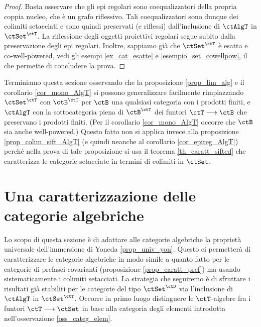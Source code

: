 \begin{proof} Basta osservare che gli epi regolari sono coequalizzatori della propria coppia nucleo, che è un grafo riflessivo.
 Tali coequalizzatori sono dunque dei colimiti setacciati e sono quindi preservati (e riflessi) dall'inclusione di \(\ctAlgT\) in \(\ctSet^{\ctT}\).
 La riflessione degli oggetti proiettivi regolari segue subito dalla preservazione degli epi regolari.
 Inoltre, sappiamo già che \(\ctSet^{\ctT}\) è esatta e co-well-powered, vedi gli esempi \ref{ex_cat_esatte} e \ref{esempio_set_cowellpow},
 il che permette di concludere la prova.
\end{proof}

\begin{remark}\label{oss_gener_limcolim}
 Terminiamo questa sezione osservando che la proposizione \ref{prop_lim_alg} e il corollario \ref{cor_mono_AlgT} si possono
 generalizzare facilmente rimpiazzando \(\ctSet^\ctT\) con \(\ctB^\ctT\) per \(\ctB\) una qualsiasi categoria con i prodotti finiti, e
 \(\ctAlgT\) con la sottocategoria piena di \(\ctB^\ctT\) dei funtori \(\ctT \fun \ctB\) che preservano i prodotti finiti. (Per il corollario
 \ref{cor_mono_AlgT} occorre che \(\ctB\) sia anche well-powered.) Questo fatto non si applica invece alla proposizione
 \ref{prop_colim_sift_AlgT} (e quindi neanche al corollario \ref{cor_epireg_AlgT}) perché nella prova di tale proposizione si usa
 il teorema \ref{th_caratt_sifted} che caratterizza le categorie setacciate in termini di colimiti in \(\ctSet\).
\end{remark}

\section{Una caratterizzazione delle categorie algebriche}\label{sec_caract_AlgT_sift}

Lo scopo di questa sezione è di adattare alle categorie algebriche la proprietà universale dell'immersione di Yoneda
\ref{prop_univ_yon}. Questo ci permetterà di caratterizzare le categorie algebriche in modo simile a quanto fatto per le
categorie di prefasci covarianti (proposizione \ref{prop_caratt_pref}) ma usando sistematicamente i colimiti setacciati.
La strategia che seguiremo è di sfruttare i risultati già stabiliti per le categorie del tipo \(\ctSet^{\ctD}\) via l'inclusione
di \(\ctAlgT\) in \(\ctSet^{\ctT}\). Occorre in primo luogo distinguere le \(\ctT\)-algebre fra i funtori \(\ctT \fun \ctSet\) in base
alla categoria degli elementi introdotta nell'osservazione \ref{oss_categ_elem}.

